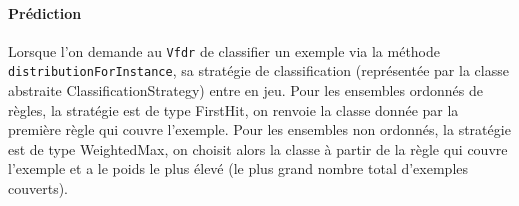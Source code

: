         \paragraph{Prédiction} Lorsque l’on demande au \texttt{Vfdr} de classifier un exemple via la méthode \texttt{distributionForInstance}, sa stratégie de classification (représentée par la classe abstraite ClassificationStrategy) entre en jeu. Pour les ensembles ordonnés de règles, la stratégie est de type FirstHit, on renvoie la classe donnée par la première règle qui couvre l’exemple. Pour les ensembles non ordonnés, la stratégie est de type WeightedMax, on choisit alors la classe à partir de la règle qui couvre l’exemple et a le poids le plus élevé (le plus grand nombre total d’exemples couverts).
